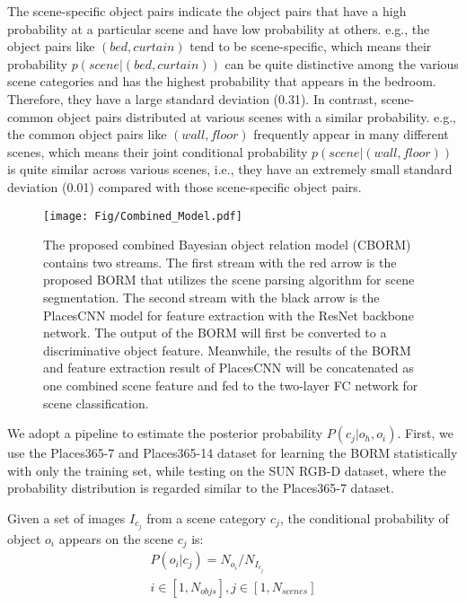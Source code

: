 \documentclass[letterpaper, 10 pt, conference]{ieeeconf}  %
\begin{document}
The scene-specific object pairs indicate the object pairs that have a high probability at a particular scene and have low probability at others. e.g., the object pairs like $(bed,curtain)$ tend to be scene-specific, which means their probability $p(scene|(bed, curtain))$ can be quite distinctive among the various scene categories and has the highest probability that appears in the bedroom. Therefore, they have a large standard deviation (0.31). In contrast, scene-common object pairs distributed at various scenes with a similar probability. e.g., the common object pairs like $(wall,floor)$ frequently appear in many different scenes, which means their joint conditional probability $p(scene|(wall, floor))$ is quite similar across various scenes, i.e., they have an extremely small standard deviation (0.01) compared with those scene-specific object pairs. 


\begin{figure*}[htbp]
	\centering
	\texttt{[image: Fig/Combined\_Model.pdf]}
	\caption{The proposed combined Bayesian object relation model (CBORM) contains two streams. The first stream with the red arrow is the proposed BORM that utilizes the scene parsing algorithm for scene segmentation. The second stream with the black arrow is the PlacesCNN model for feature extraction with the ResNet backbone network. The output of the BORM will first be converted to a discriminative object feature. Meanwhile, the results of the BORM and feature extraction result of PlacesCNN will be concatenated as one combined scene feature and fed to the two-layer FC network for scene classification.}
	\label{fig:combined_model}
\end{figure*}

We adopt a pipeline to estimate the posterior probability $P(c_j |o_h, o_i)$. First, we use the Places365-7 and Places365-14 dataset for learning the BORM statistically with only the training set, while testing on the SUN RGB-D dataset, where the probability distribution is regarded similar to the Places365-7 dataset. 

Given a set of images $I_{c_j}$ from a scene category $c_j$, the conditional probability of object $o_i$ appears on the scene $c_j$ is:
\begin{equation}
\begin{split}
P\left(o_{i} | c_{j}\right) = N_{o_i} / N_{I_{c_j}} \\
i \in [1,N_{objs}], j \in [1,N_{scenes}]
\end{split}
\end{equation}
\end{document}
